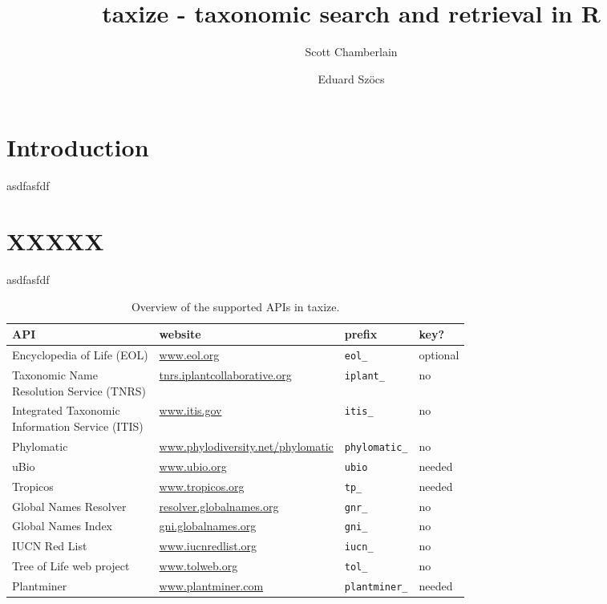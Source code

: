 \documentclass[letterpaper,superscriptaddress,showkeys,longbibliography]{revtex4-1}
\begin{document}
\title{taxize - taxonomic search and retrieval in R}

\author{Scott Chamberlain}

\author{Eduard Sz\"{o}cs}


\maketitle

\section{Introduction}

asdfasfdf

\section{XXXXX}

asdfasfdf

\begin{table}[htbp]
\caption{Overview of the supported APIs in taxize.}
\begin{tabular}{llll}
\textbf{API} & \textbf{website} & \textbf{prefix} & \textbf{key?} \\ \hline
Encyclopedia of Life (EOL)  & \url{www.eol.org} & \verb|eol_| & optional \\ 
\shortstack{Taxonomic Name \\ Resolution Service (TNRS)} & \url{tnrs.iplantcollaborative.org} & \verb|iplant_| & no \\ 
\shortstack{Integrated Taxonomic \\ Information Service (ITIS)}  & \url{www.itis.gov} & \verb|itis_| & no \\ 
Phylomatic & \url{www.phylodiversity.net/phylomatic} & \verb|phylomatic_| & no \\ 
uBio & \url{www.ubio.org} & \verb|ubio| & needed \\ 
Tropicos & \url{www.tropicos.org} & \verb|tp_| & needed \\ 
Global Names Resolver  & \url{resolver.globalnames.org} & \verb|gnr_| & no \\ 
Global Names Index & \url{gni.globalnames.org} & \verb|gni_| & no \\ 
IUCN Red List  & \url{www.iucnredlist.org} & \verb|iucn_| & no \\ 
Tree of Life web project  & \url{www.tolweb.org} & \verb|tol_| & no \\ 
Plantminer  & \url{www.plantminer.com} & \verb|plantminer_| & needed \\ 
\end{tabular}
\label{tab:overview}
\end{table}
\end{document}
